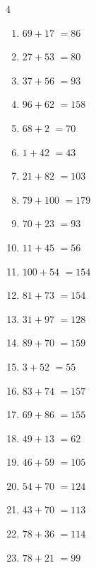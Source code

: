 \begin{multicols}{4}
\begin{enumerate}
  \item $69+17$
        $=86$

  \item $27+53$
        $=80$

  \item $37+56$
        $=93$

\columnbreak %

  \item $96+62$
        $=158$

  \item $68+2$
        $=70$

  \item $1+42$
        $=43$

  \item $21+82$
        $=103$

  \item $79+100$
        $=179$

  \item $70+23$
        $=93$

  \item $11+45$
        $=56$

  \item $100+54$
        $=154$

  \item $81+73$
        $=154$

  \item $31+97$
        $=128$

  \item $89+70$
        $=159$

  \item $3+52$
        $=55$

  \item $83+74$
        $=157$

  \item $69+86$
        $=155$

  \item $49+13$
        $=62$

  \item $46+59$
        $=105$

  \item $54+70$
        $=124$

  \item $43+70$
        $=113$

  \item $78+36$
        $=114$

  \item $78+21$
        $=99$


\end{enumerate}
\end{multicols}
